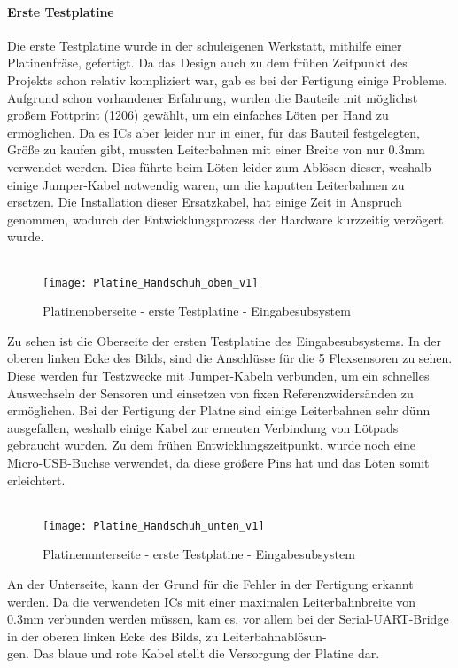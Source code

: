 \documentclass[titlepage,12pt,twoside]{article}
\begin{document}
\paragraph{Erste Testplatine}
\hfill \break
\hfill \break
Die erste Testplatine wurde in der schuleigenen Werkstatt, mithilfe einer Platinenfräse,
gefertigt. Da das Design auch zu dem frühen Zeitpunkt des Projekts schon relativ kompliziert
war, gab es bei der Fertigung einige Probleme. Aufgrund schon vorhandener Erfahrung,
wurden die Bauteile mit möglichst großem Fottprint (1206) gewählt, um ein einfaches Löten
per Hand zu ermöglichen. Da es ICs aber leider nur in einer, für das Bauteil festgelegten,
Größe zu kaufen gibt, mussten Leiterbahnen mit einer Breite von nur 0.3mm verwendet
werden. Dies führte beim Löten leider zum Ablösen dieser, weshalb einige Jumper-Kabel
notwendig waren, um die kaputten Leiterbahnen zu ersetzen. Die Installation dieser Ersatzkabel,
hat einige Zeit in Anspruch genommen, wodurch der Entwicklungsprozess der Hardware
kurzzeitig verzögert wurde. \\
\\
\begin{figure}[H]
	\begin{center}
		\scalebox{0.55}
		{\texttt{[image: Platine\_Handschuh\_oben\_v1]}}
		\caption{Platinenoberseite - erste Testplatine - Eingabesubsystem}
		\label{fig:Platine_Handschuh_oben_v1}		
	\end{center}
\end{figure}
\hfill \break
Zu sehen ist die Oberseite der ersten Testplatine des Eingabesubsystems. In der oberen linken Ecke des Bilds, sind die Anschlüsse für die 5 Flexsensoren zu sehen. Diese werden für Testzwecke mit 
Jumper-Kabeln verbunden, um ein schnelles Auswechseln der Sensoren und einsetzen von fixen Referenzwidersänden zu ermöglichen. Bei der Fertigung der Platne sind einige Leiterbahnen sehr dünn ausgefallen, 
weshalb einige Kabel zur erneuten Verbindung von Lötpads gebraucht wurden. Zu dem frühen Entwicklungszeitpunkt, wurde noch eine Micro-USB-Buchse verwendet, da diese größere Pins hat und das Löten somit erleichtert. \\
\\

\begin{figure}[H]
	\begin{center}
		\scalebox{0.6}
		{\texttt{[image: Platine\_Handschuh\_unten\_v1]}}
		\caption{Platinenunterseite - erste Testplatine - Eingabesubsystem}
		\label{fig:Platine_Handschuh_unten_v1}	
	\end{center}
\end{figure}
\hfill \break
An der Unterseite, kann der Grund für die Fehler in der Fertigung erkannt werden. Da die verwendeten ICs mit einer maximalen Leiterbahnbreite von 0.3mm verbunden werden müssen, kam es, vor allem bei der Serial-UART-Bridge in der
oberen linken Ecke des Bilds, zu Leiterbahnablösun-\\gen. Das blaue und rote Kabel stellt die Versorgung der Platine dar. 
\newpage
\end{document}

